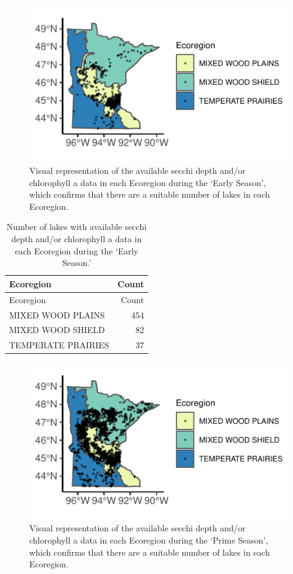 \documentclass[12pt,]{article}
\begin{document}
\begin{figure}
\centering
\includegraphics{Bollt_Greif_Raby_Roth_Project_Final_files/figure-latex/unnamed-chunk-11-1.pdf}
\caption{Visual representation of the available secchi depth and/or
chlorophyll a data in each Ecoregion during the `Early Season', which
confirms that there are a suitable number of lakes in each Ecoregion.}
\end{figure}

\begin{longtable}[]{@{}lr@{}}
\caption{Number of lakes with available secchi depth and/or chlorophyll
a data in each Ecoregion during the `Early Season.'}\tabularnewline
\toprule
Ecoregion & Count\tabularnewline
\midrule
\endfirsthead
\toprule
Ecoregion & Count\tabularnewline
\midrule
\endhead
MIXED WOOD PLAINS & 454\tabularnewline
MIXED WOOD SHIELD & 82\tabularnewline
TEMPERATE PRAIRIES & 37\tabularnewline
\bottomrule
\end{longtable}

\begin{figure}
\centering
\includegraphics{Bollt_Greif_Raby_Roth_Project_Final_files/figure-latex/unnamed-chunk-13-1.pdf}
\caption{Visual representation of the available secchi depth and/or
chlorophyll a data in each Ecoregion during the `Prime Season', which
confirms that there are a suitable number of lakes in each Ecoregion.}
\end{figure}
\end{document}
